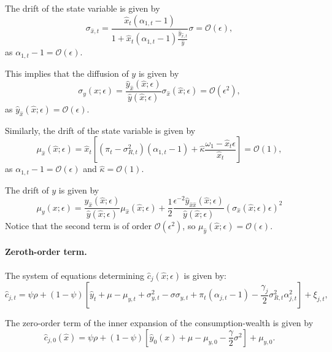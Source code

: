 \documentclass[11pt,english]{article}
\begin{document}
The drift of the state variable is given by
\begin{equation}
    \sigma_{\hat{x},t} = \frac{\hat{x}_t (\alpha_{1,t} -1)}{1+ \hat{x}_t (\alpha_{1,t}-1) \frac{\hat{y}_{\hat{x},t}}{\hat{y}}} \sigma = \mathcal{O}(\epsilon),
\end{equation}
as $\alpha_{1,t} -1= \mathcal{O}(\epsilon)$.

This implies that the diffusion of $y$ is given by
\begin{equation}
    \sigma_{y}(x;\epsilon) = \frac{\hat{y}_{\hat{x}}(\hat{x};\epsilon)}{\hat{y}(\hat{x};\epsilon)} \sigma_{\hat{x}}(\hat{x};\epsilon) = \mathcal{O}(\epsilon^2),
\end{equation}
as $\hat{y}_{\hat{x}}(\hat{x};\epsilon) = \mathcal{O}(\epsilon)$.

Similarly, the drift of the state variable is given by
\begin{equation}
    \mu_{\hat{x}}(\hat{x};\epsilon) = \hat{x}_t \left[  (\pi_t-\sigma_{R,t}^2) (\alpha_{1,t}  -1)+ \hat{\kappa} \frac{\omega_1 - \hat{x}_t \epsilon}{\hat{x}_t} \right] = \mathcal{O}(1),
\end{equation}
as $\alpha_{1,t} -1 = \mathcal{O}(\epsilon)$ and $\hat{\kappa} = \mathcal{O}(1)$.

The drift of $y$ is given by
\begin{equation}
    \mu_{y}(x;\epsilon) = \frac{\hat{y}_{\hat{x}}(\hat{x};\epsilon)}{\hat{y}(\hat{x};\epsilon)} \mu_{\hat{x}}(\hat{x};\epsilon) + \frac{1}{2} \frac{\epsilon^{-2}\hat{y}_{\hat{x}\hat{x}}(\hat{x};\epsilon)}{\hat{y}(\hat{x};\epsilon)} (\sigma_{\hat{x}}(\hat{x};\epsilon) \epsilon)^ 2
\end{equation}
Notice that the second term is of order $\mathcal{O}(\epsilon^2)$, so $\mu_{\hat{y}}(\hat{x};\epsilon) = \mathcal{O}(\epsilon)$. 

\paragraph{Zeroth-order term.} 
The system of equations determining $\hat{c}_{j}(\hat{x};\epsilon)$ is given by:
\begin{equation}
    \hat{c}_{j,t} = \psi \rho + (1-\psi) \left[ \hat{y}_t + \mu - \mu_{y,t} +\sigma_{y,t}^2 - \sigma \sigma_{y,t} + \pi_t (\alpha_{j,t}-1) - \frac{\gamma_j}{2} \sigma_{R,t}^2 \alpha_{j,t}^2 \right] + \xi_{j,t},
\end{equation}

The zero-order term of the inner expansion of the consumption-wealth is given by
\begin{equation}
    \hat{c}_{j,0}(\hat{x}) = \psi \rho + (1-\psi) \left[ \hat{y}_0(x) + \mu - \mu_{y,0}  - \frac{\gamma}{2} \sigma^2 \right] + \mu_{y,0}.
\end{equation}
\end{document}
